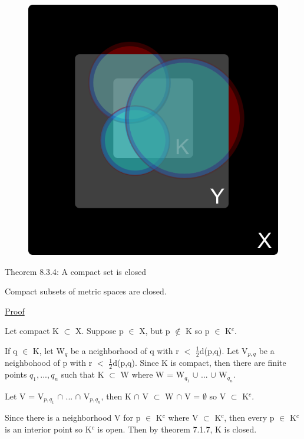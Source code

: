 \begin{figure}[h]
	\centering
	\includegraphics[scale=0.35]{Images/8.3.3.png}
\end{figure}

\newpage

{ \color{red} Theorem 8.3.4: A compact set is closed } 

	\begin{adjustbox}{minipage=14cm, right, vspace=0.1cm 0cm}
		Compact subsets of metric spaces are closed.
	\end{adjustbox}

{ \color{magenta} \underline{Proof} } 

	Let compact K $\subset$ X.
	Suppose p $\in$ X, but p $\not \in$ K so p $\in$ K$^c$.

	If q $\in$ K, let W$_q$ be a neighborhood of q with
	r $<$ $\frac{1}{2}$d(p,q).
	Let V$_{p,q}$ be a neighbohood of p with r $<$ $\frac{1}{2}$d(p,q).
	Since K is compact, then there are finite points $q_1, ... , q_n$
	such that K $\subset$ W where W = W$_{q_1}$ $\cup$ ... $\cup$ W$_{q_n}$.

	Let V = V$_{p,q_1}$ $\cap$ ... $\cap$ V$_{p,q_n}$, then
	K $\cap$ V $\subset$ W $\cap$ V = $\emptyset$ so V $\subset$ K$^c$.

	Since there is a neighborhood V for p $\in$ K$^c$ where V $\subset$ K$^c$,
	then every p $\in$ K$^c$ is an interior point so K$^c$ is open.
	Then by {\color{red} theorem 7.1.7}, K is closed. \\

